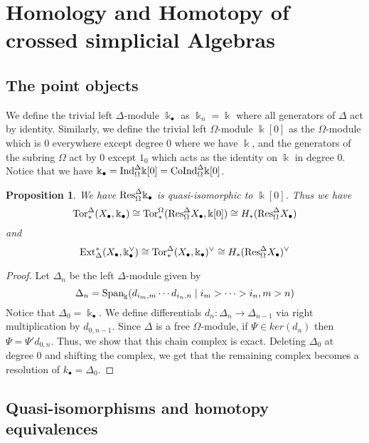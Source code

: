 \documentclass[a4paper,11pt]{amsart}
\newtheorem{proposition}[theorem]{Proposition}
\theoremstyle{definition}
\newcommand{\Span}{\text{\rm Span}}
\newcommand{\Tor}{\text{\rm Tor}}
\newcommand{\Ind}{\text{\rm Ind}}
\newcommand{\Res}{\text{\rm Res}}
\newcommand{\Ext}{\text{\rm Ext}}
\newcommand{\CoInd}{\text{\rm CoInd}}
\newcommand{\Simp}{{\Delta}}
\newcommand{\Diff}{{\Omega}}
\begin{document}
\section{Homology and Homotopy of crossed simplicial Algebras}

\subsection{The point objects}

We define the trivial left $\Simp$-module $\Bbbk_\bullet$ as $\Bbbk_n = \Bbbk$ where all generators of $\Delta$ act by identity.  Similarly, we define the trivial left $\Diff$-module $\Bbbk[0]$ as the $\Diff$-module which is $0$ everywhere except degree 0 where we have $\Bbbk$, and the generators of the subring $\Diff$ act by 0 except $1_0$ which acts as the identity on $\Bbbk$ in degree 0. Notice that we have $\Bbbk_\bullet = \Ind_{\Diff}^{\Simp}\Bbbk[0] = \CoInd_{\Diff}^{\Simp}\Bbbk[0]$. 

\begin{proposition}\label{prop:quasi-equivalence}
  We have
  $\Res^{\Simp}_{\Diff} \Bbbk_\bullet$ is quasi-isomorphic to $\Bbbk[0]$. Thus we have
  \[ \Tor^{\Simp}_*(X_\bullet,\Bbbk_\bullet)\cong 
     \Tor^{\Diff}_*(\Res^{\Simp}_{\Diff}X_\bullet,\Bbbk[0])\cong 
     H_*(\Res^{\Simp}_{\Diff}X_\bullet) 
  \] and
  \[ \Ext_{\Simp}^*(X_\bullet,\Bbbk_\bullet^\vee) 
     \cong \Tor^{\Simp}_*(X_\bullet,\Bbbk_\bullet)^\vee
     \cong H_*(\Res^{\Simp}_{\Diff}X_\bullet)^\vee
  \]
\end{proposition}

\begin{proof}
  Let $\Simp_n$ be the left $\Simp$-module given by
  \[ \Simp_n = %
  \Span_{\Bbbk}(d_{i_m,m}\cdots d_{i_{n},n}\mid i_m>\cdots>i_{n}, m>n) 
  \]
  Notice that $\Simp_0 = \Bbbk_\bullet$. We define differentials $d_n\colon \Simp_n\to\Simp_{n-1}$
  via right multiplication by $d_{0,n-1}$. Since $\Simp$ is a free $\Diff$-module, if
  $\Psi\in ker(d_n)$ then $\Psi = \Psi' d_{0,n}$. Thus, we show that this chain complex is
  exact. Deleting $\Simp_0$ at degree 0 and shifting the complex, we get that the remaining
  complex becomes a resolution of $k_\bullet = \Simp_0$.
\end{proof}

\subsection{Quasi-isomorphisms and homotopy equivalences}
\end{document}
